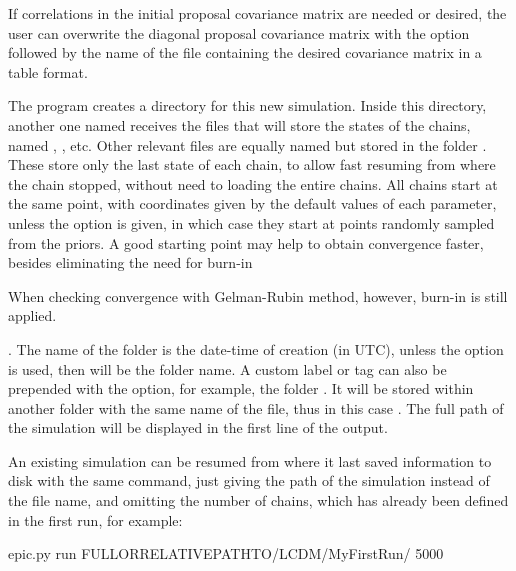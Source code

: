\documentclass[letterpaper,12pt,english]{sphinxhowto}
\begin{document}
If correlations in the initial proposal covariance matrix are needed or
desired, the user can overwrite the diagonal proposal covariance matrix with
the option  followed by the name of the file
containing the desired covariance matrix in a table format.

The program creates a directory for this new simulation. Inside this directory,
another one named  receives the files that will store the states of
the chains, named , , etc.
Other relevant files are equally named but stored in the folder
. These store only the last state of each chain, to allow
fast resuming from where the chain stopped, without need to loading the entire
chains.
All chains start at the same point, with coordinates given by the default
values of each parameter, unless the option  is given, in
which case they start at points randomly sampled from the priors.
A good starting point may help to obtain convergence faster, besides
eliminating the need for burn-in %
\begin{footnote}[1]\sphinxAtStartFootnote
When checking convergence with Gelman-Rubin method, however, burn-in is still applied.
%
\end{footnote}.
The name of the folder is the date-time of creation (in UTC), unless the option
 is used, then  will be the
folder name.
A custom label or tag can also be prepended with the 
option, for example, the folder .
It will be stored within another folder with the same name of the 
file, thus in this case .
The full path of the simulation will be displayed in the first line of the output.

An existing simulation can be resumed from where it last saved information to
disk with the same command, just giving the path of the simulation instead of
the  file name, and omitting the number of chains, which has already
been defined in the first run, for example:

%
\begin{sphinxVerbatim}[commandchars=\\\{\}]
\PYGZdl{} epic.py run \PYGZlt{}FULL\PYGZhy{}OR\PYGZhy{}RELATIVE\PYGZhy{}PATH\PYGZhy{}TO\PYGZgt{}/LCDM/MyFirstRun/ 5000
\end{sphinxVerbatim}
\end{document}
